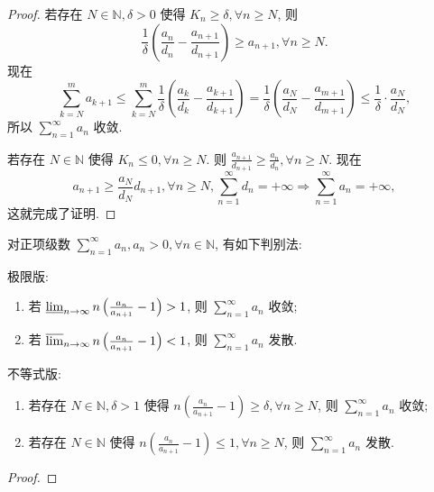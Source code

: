\documentclass[../../main.tex]{subfiles}%
\begin{document}
\begin{proof}

若存在 \( N \in \mathbb{N}, \delta > 0 \) 使得 \( K_n \geqslant \delta, \forall n \geqslant N \), 则
\[
\frac{1}{\delta} \left( \frac{a_n}{d_n} - \frac{a_{n + 1}}{d_{n + 1}} \right) \geqslant a_{n + 1}, \forall n \geqslant N.
\]
现在
\[
\sum_{k=N}^m a_{k + 1} \leqslant \sum_{k=N}^m \frac{1}{\delta} \left( \frac{a_k}{d_k} - \frac{a_{k + 1}}{d_{k + 1}} \right) = \frac{1}{\delta} \left( \frac{a_N}{d_N} - \frac{a_{m + 1}}{d_{m + 1}} \right) \leqslant \frac{1}{\delta} \cdot \frac{a_N}{d_N},
\]
所以 \( \sum_{n=1}^\infty a_n \) 收敛.

若存在 \( N \in \mathbb{N} \) 使得 \( K_n \leqslant 0, \forall n \geqslant N \). 则 \( \frac{a_{n + 1}}{d_{n + 1}} \geqslant \frac{a_n}{d_n}, \forall n \geqslant N \). 现在
\[
a_{n + 1} \geqslant \frac{a_N}{d_N} d_{n + 1}, \forall n \geqslant N, \sum_{n=1}^\infty d_n = +\infty \Rightarrow \sum_{n=1}^\infty a_n = +\infty,
\]
这就完成了证明.

\end{proof}

\begin{theorem}[Raabe判别法]\label{theorem:Raabe(拉比)判别法}
对正项级数 \( \sum_{n=1}^\infty a_n, a_n > 0, \forall n \in \mathbb{N} \), 有如下判别法:

极限版:
\begin{enumerate}
\item 若 \( \varliminf_{n \to \infty} n \left( \frac{a_n}{a_{n + 1}} - 1 \right) > 1 \), 则 \( \sum_{n=1}^\infty a_n \) 收敛;
\item 若 \( \varlimsup_{n \to \infty} n \left( \frac{a_n}{a_{n + 1}} - 1 \right) < 1 \), 则 \( \sum_{n=1}^\infty a_n \) 发散.
\end{enumerate}

不等式版:
\begin{enumerate}
\item 若存在 \( N \in \mathbb{N}, \delta > 1 \) 使得 \( n \left( \frac{a_n}{a_{n + 1}} - 1 \right) \geqslant \delta, \forall n \geqslant N \), 则 \( \sum_{n=1}^\infty a_n \) 收敛;
\item 若存在 \( N \in \mathbb{N} \) 使得 \( n \left( \frac{a_n}{a_{n + 1}} - 1 \right) \leqslant 1, \forall n \geqslant N \), 则 \( \sum_{n=1}^\infty a_n \) 发散.
\end{enumerate}
\end{theorem}
\begin{proof}



\end{proof}
\end{document}
